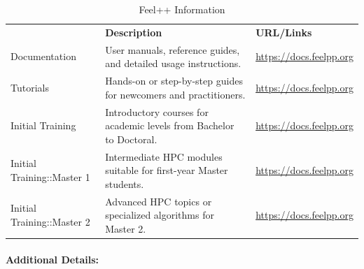 \begin{table}[H]
{{%
    {
    \setlength{\parindent}{0pt}
    \def\arraystretch{1.25}
    {\fontsize{9}{11}\selectfont
    \begin{tabular}{!{\color{numpexgray}\vrule}p{0.20\textwidth}
                    !{\color{numpexgray}\vrule}p{0.40\textwidth}
                    !{\color{numpexgray}\vrule}p{0.35\textwidth}
                    !{\color{numpexgray}\vrule}}
         & {\rule{0pt}{2.5ex}\color{white}\bf Description} 
         & {\rule{0pt}{2.5ex}\color{white}\bf URL/Links} \\
Documentation & User manuals, reference guides, and detailed usage instructions. & \url{https://docs.feelpp.org} \\
Tutorials & Hands-on or step-by-step guides for newcomers and practitioners. & \url{https://docs.feelpp.org} \\
Initial Training & Introductory courses for academic levels from Bachelor to Doctoral. & \url{https://docs.feelpp.org} \\
Initial Training::Master 1 & Intermediate HPC modules suitable for first-year Master students. & \url{https://docs.feelpp.org}\\
Initial Training::Master 2 & Advanced HPC topics or specialized algorithms for Master 2. & \url{https://docs.feelpp.org} \\
\bottomrule
    \end{tabular}
    }}

    }}
    \caption{Feel++ Information}
\end{table}


\paragraph{Additional Details:}

